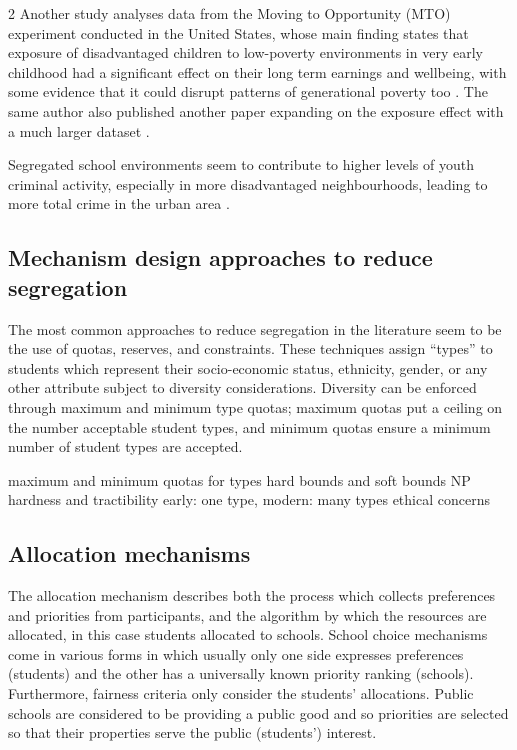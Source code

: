 \documentclass{article}
\begin{document}
\begin{multicols}{2}
Another study analyses data from the Moving to Opportunity (MTO) experiment conducted in the United States, whose main finding states that exposure of disadvantaged children to low-poverty environments in very early childhood had a significant effect on their long term earnings and wellbeing, with some evidence that it could disrupt patterns of generational poverty too \cite{chettyEffectsExposureBetter2016}. The same author also published another paper expanding on the exposure effect with a much larger dataset \cite{chettyImpactsNeighborhoodsIntergenerational2018}.

Segregated school environments seem to contribute to higher levels of youth criminal activity, especially in more disadvantaged neighbourhoods, leading to more total crime in the urban area \cite{billingsPartnersCrime2019}.

\subsection{Mechanism design approaches to reduce segregation}
The most common approaches to reduce segregation in the literature seem to be the use of quotas, reserves, and constraints. These techniques assign \enquote{types} to students which represent their socio-economic status, ethnicity, gender, or any other attribute subject to diversity considerations. Diversity can be enforced through maximum and minimum type quotas; maximum quotas put a ceiling on the number acceptable student types, and minimum quotas ensure a minimum number of student types are accepted.

maximum and minimum quotas for types
hard bounds and soft bounds
NP hardness and tractibility
early: one type, modern: many types
ethical concerns

\subsection{Allocation mechanisms}
The allocation mechanism describes both the process which collects preferences and priorities from participants, and the algorithm by which the resources are allocated, in this case students allocated to schools. School choice mechanisms come in various forms in which usually only one side expresses preferences (students) and the other has a universally known priority ranking (schools). Furthermore, fairness criteria only consider the students' allocations. Public schools are considered to be providing a public good and so priorities are selected so that their properties serve the public (students') interest. %


\end{multicols}
\end{document}
